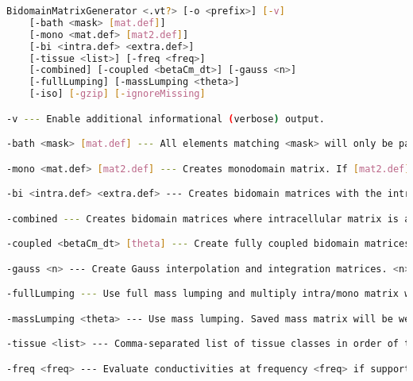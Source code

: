 \begin{lstlisting}[language=bash,caption=Runtime options for BidomainMatrixGenerator]
BidomainMatrixGenerator <.vt?> [-o <prefix>] [-v]
    [-bath <mask> [mat.def]]
    [-mono <mat.def> [mat2.def]]
    [-bi <intra.def> <extra.def>]
    [-tissue <list>] [-freq <freq>]
    [-combined] [-coupled <betaCm_dt>] [-gauss <n>]
    [-fullLumping] [-massLumping <theta>]
    [-iso] [-gzip] [-ignoreMissing]

-v --- Enable additional informational (verbose) output.

-bath <mask> [mat.def] --- All elements matching <mask> will only be part of the extracellular domain. Requires [-bi ...]. If [mat.def] is not given, <extra.def> is used.

-mono <mat.def> [mat2.def] --- Creates monodomain matrix. If [mat2.def] is given, the conductivity will be the harmonic mean of the two given conductivities for each cell (parallel circuit).

-bi <intra.def> <extra.def> --- Creates bidomain matrices with the intra- and extracellular conductivities from the given material files.

-combined --- Creates bidomain matrices where intracellular matrix is already added to extracellular matrix.

-coupled <betaCm_dt> [theta] --- Create fully coupled bidomain matrices (LHS and RHS) <betaCm_dt> is (beta*C_m)/dt. theta is the time discretization weight (0=explicit, 1=implicit, 0.5=Crank-Nicolson, default = 0).

-gauss <n> --- Create Gauss interpolation and integration matrices. <n> is the number of Gauss points. Default integration rules are provided.

-fullLumping --- Use full mass lumping and multiply intra/mono matrix with inverse of lumped mass matrix. Will not save mass matrix separately. Does not apply with -coupled. Use -massLumping 0 instead.

-massLumping <theta> --- Use mass lumping. Saved mass matrix will be weighted sum: M* = (theta)M + (1-theta)*M_lumped Usually, you would choose theta in [0,1]. Different choices may work, however.

-tissue <list> --- Comma-separated list of tissue classes in order of their, precedence when creating the tissue vector. Highest precedence first. Default: smaller numbers have higher precedence.

-freq <freq> --- Evaluate conductivities at frequency <freq> if supported.


\end{lstlisting}
